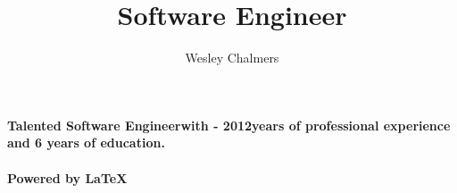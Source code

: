 \documentclass{memoir}
\begin{document}
\def\jobtitle{Software Engineer}
\title{\jobtitle}
\author{Wesley Chalmers}
\maketitle
\def\numyearsworking{\number\numexpr \the\year - 2012\relax}
\paragraph{Talented \jobtitle\space with \numyearsworking \space years of professional experience and 6 years of education.}
\paragraph{Powered by \LaTeX{}}
\end{document}
